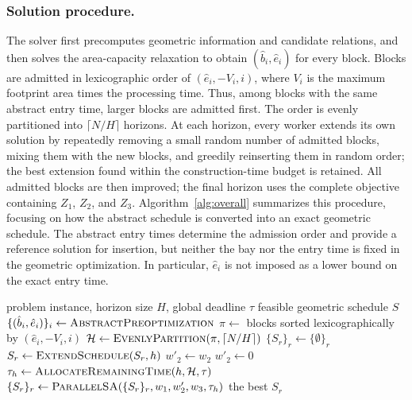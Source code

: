 \documentclass[runningheads]{llncs}
\begin{document}
\subsubsection{Solution procedure.}
The solver first precomputes geometric information and candidate relations,
and then solves the area-capacity relaxation to obtain $(\hat b_i,\hat e_i)$
for every block. Blocks are admitted in lexicographic order of
$(\hat e_i,-V_i,i)$, where $V_i$ is the maximum footprint area times the processing time. Thus, among blocks with the same abstract entry time, larger blocks are admitted first. The order is evenly partitioned into $\lceil N/H\rceil$ horizons. At each horizon, every worker extends its own solution by repeatedly removing a small random number of admitted blocks, mixing them with the new blocks, and greedily reinserting them in random order; the best extension found within the construction-time budget is retained. All admitted blocks are then improved;
the final horizon uses the complete objective containing $Z_1$, $Z_2$, and
$Z_3$. Algorithm~\ref{alg:overall} summarizes this procedure, focusing on how
the abstract schedule is converted into an exact geometric schedule. The
abstract entry times determine the admission order and provide a reference
solution for insertion, but neither the bay nor the entry time is fixed in the
geometric optimization. In particular, $\hat e_i$ is not imposed as a lower
bound on the exact entry time.

\begin{algorithm}[t]
\caption{Overall solution procedure}
\label{alg:overall}
\begin{algorithmic}[1]
\Require problem instance, horizon size $H$, global deadline $\tau$
\Ensure feasible geometric schedule $S$
\State $\{(\hat b_i,\hat e_i)\}_i \gets \Call{AbstractPreoptimization}{}$
\State $\pi \gets$ blocks sorted lexicographically by $(\hat e_i,-V_i,i)$
\State $\mathcal{H} \gets \Call{EvenlyPartition}{\pi,\lceil N/H\rceil}$
\State $\{S_r\}_r\gets\{\emptyset\}_r$
        \State $S_r\gets\Call{ExtendSchedule}{S_r,h}$
    \EndFor
        \State $w'_2\gets w_2$
    \Else
        \State $w'_2\gets 0$
    \EndIf
    \State $\tau_h\gets\Call{AllocateRemainingTime}{h,\mathcal{H},\tau}$
    \State $\{S_r\}_r\gets\Call{ParallelSA}{\{S_r\}_r,w_1,w'_2,w_3,\tau_h}$
\EndFor
\State \Return the best $S_r$
\end{algorithmic}
\end{algorithm}
\end{document}
